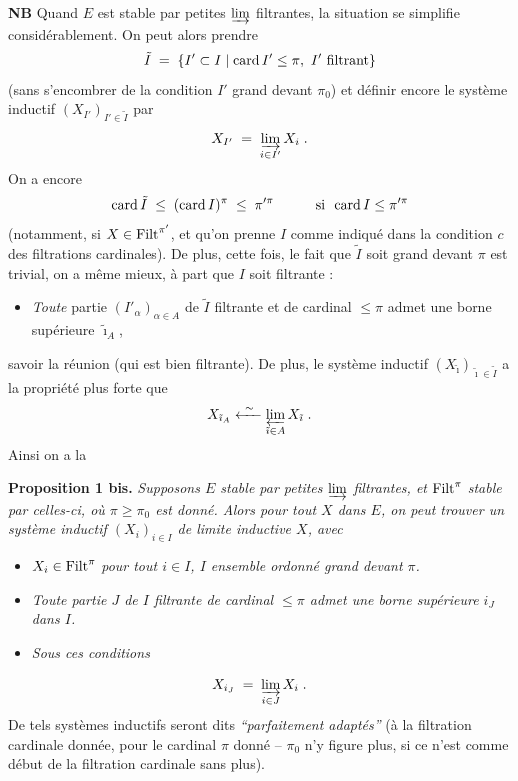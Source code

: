 \textbf{NB} Quand $E$ est stable par petites $\varinjlim$ filtrantes, la situation se simplifie considérablement. On peut alors prendre
\[
\tilde I \;=\; \{I'\subset I \mid \mathrm{card}\, I'\le\pi,\ I' \text{ filtrant}\}
\]
(sans s'encombrer de la condition $I'$ grand devant $\pi_0$) et définir encore le système inductif $(X_{I'})_{I'\in\tilde I}$ par
\[
X_{I'} \;=\; \varinjlim_{i\in I'} X_i \;.
\]
On a encore
\[
\mathrm{card}\,\tilde I \;\le\; (\mathrm{card}\, I)^\pi \;\le\; \pi'^{\pi} \qquad\quad \text{si }\ \mathrm{card}\, I\le\pi'^{\pi}
\]
(notamment, si $X\in\mathrm{Filt}^{\pi'}$, et qu'on prenne $I$ comme indiqué dans la condition $c$ des filtrations cardinales). De plus, cette fois, le fait que $\tilde I$ soit grand devant $\pi$ est trivial, on a même mieux, à part que $I$ soit filtrante :

\begin{itemize}
\item[$(*)$] \textit{Toute} partie $(I'_\alpha)_{\alpha\in A}$ de $\tilde I$ filtrante et de cardinal $\le\pi$ admet une borne supérieure $\tilde\imath_A$,
\end{itemize}

savoir la réunion (qui est bien filtrante). De plus, le système inductif $(X_{\tilde\imath})_{\tilde\imath\in\tilde I}$ a la propriété plus forte que
\[
X_{\tilde\imath_A} \xleftarrow{\ \sim\ } \varprojlim_{\tilde\imath\in A} X_{\tilde\imath} \;. %
\]
Ainsi on a la

\textbf{Proposition 1 bis.} \textit{Supposons $E$ stable par petites $\varinjlim$ filtrantes, et} $\mathrm{Filt}^\pi$ \textit{stable par celles-ci, où $\pi\ge\pi_0$ est donné. Alors pour tout $X$ dans $E$, on peut trouver un système inductif $(X_i)_{i\in I}$ de limite inductive $X$, avec}

\begin{itemize}
\item[a)] $X_i\in\mathrm{Filt}^\pi$ \textit{pour tout $i\in I$, $I$ ensemble ordonné grand devant $\pi$.}
\item[b)] \textit{Toute partie $J$ de $I$ filtrante de cardinal $\le\pi$ admet une borne supérieure $i_J$ dans $I$.}
\item[c)] \textit{Sous ces conditions}
\end{itemize}

\[
X_{i_J} \;=\; \varinjlim_{i\in J} X_i \;.
\]
De tels systèmes inductifs seront dits \textit{“parfaitement adaptés”} (à la filtration cardinale donnée, pour le cardinal $\pi$ donné – $\pi_0$ n'y figure plus, si ce n'est comme début de la filtration cardinale sans plus).

